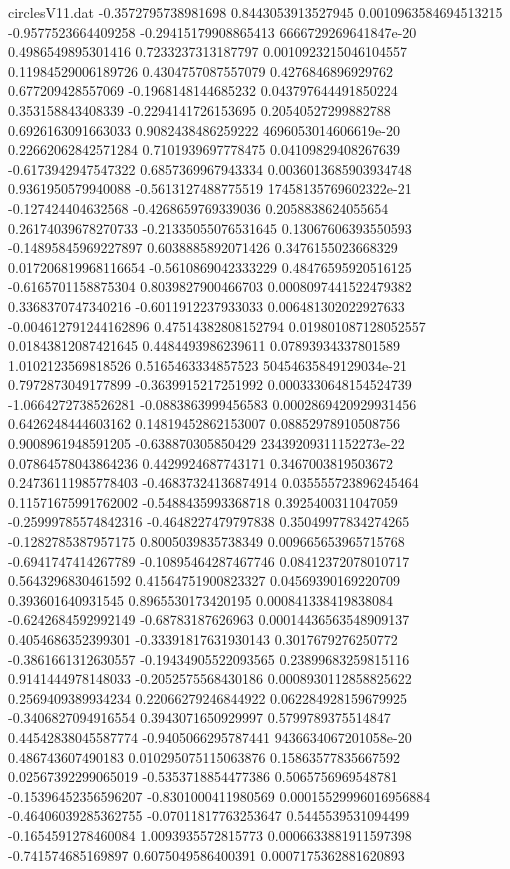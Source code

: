 \begin{filecontents}{circlesV11.dat}
-0.3572795738981698	0.8443053913527945	0.0010963584694513215
-0.9577523664409258	-0.29415179908865413	6666729269641847e-20
0.4986549895301416	0.7233237313187797	0.0010923215046104557
0.11984529006189726	0.4304757087557079	0.4276846896929762
0.677209428557069	-0.1968148144685232	0.043797644491850224
0.353158843408339	-0.2294141726153695	0.20540527299882788
0.6926163091663033	0.9082438486259222	4696053014606619e-20
0.22662062842571284	0.7101939697778475	0.04109829408267639
-0.6173942947547322	0.6857369967943334	0.0036013685903934748
0.9361950579940088	-0.5613127488775519	17458135769602322e-21
-0.127424404632568	-0.4268659769339036	0.2058838624055654
0.26174039678270733	-0.21335055076531645	0.13067606393550593
-0.14895845969227897	0.6038885892071426	0.3476155023668329
0.017206819968116654	-0.5610869042333229	0.48476595920516125
-0.6165701158875304	0.8039827900466703	0.0008097441522479382
0.3368370747340216	-0.6011912237933033	0.006481302022927633
-0.004612791244162896	0.47514382808152794	0.019801087128052557
0.01843812087421645	0.4484493986239611	0.07893934337801589
1.0102123569818526	0.5165463334857523	50454635849129034e-21
0.7972873049177899	-0.3639915217251992	0.0003330648154524739
-1.0664272738526281	-0.0883863999456583	0.0002869420929931456
0.6426248444603162	0.14819452862153007	0.08852978910508756
0.9008961948591205	-0.638870305850429	23439209311152273e-22
0.07864578043864236	0.4429924687743171	0.3467003819503672
0.24736111985778403	-0.46837324136874914	0.035555723896245464
0.11571675991762002	-0.5488435993368718	0.3925400311047059
-0.25999785574842316	-0.4648227479797838	0.35049977834274265
-0.1282785387957175	0.8005039835738349	0.009665653965715768
-0.6941747414267789	-0.10895464287467746	0.08412372078010717
0.5643296830461592	0.41564751900823327	0.04569390169220709
0.393601640931545	0.8965530173420195	0.000841338419838084
-0.6242684592992149	-0.68783187626963	0.00014436563548909137
0.4054686352399301	-0.33391817631930143	0.3017679276250772
-0.3861661312630557	-0.19434905522093565	0.23899683259815116
0.9141444978148033	-0.2052575568430186	0.0008930112858825622
0.2569409389934234	0.22066279246844922	0.062284928159679925
-0.3406827094916554	0.3943071650929997	0.5799789375514847
0.44542838045587774	-0.9405066295787441	9436634067201058e-20
0.486743607490183	0.010295075115063876	0.15863577835667592
0.02567392299065019	-0.5353718854477386	0.5065756969548781
-0.15396452356596207	-0.8301000411980569	0.00015529996016956884
-0.46406039285362755	-0.07011817763253647	0.5445539531094499
-0.1654591278460084	1.0093935572815773	0.0006633881911597398
-0.741574685169897	0.6075049586400391	0.0007175362881620893

\end{filecontents}
